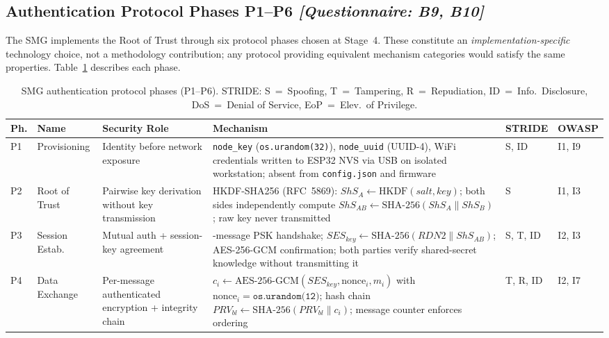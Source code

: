 \documentclass[12pt,a4paper]{article}
\newcommand{\qtag}[1]{\hfill\textcolor{gray!70}{\small\textit{[Questionnaire: #1]}}}
\begin{document}
\subsection{Authentication Protocol Phases P1--P6 \qtag{B9, B10}}
\label{sec:phases}

The SMG implements the Root of Trust through six protocol phases chosen at Stage~4. These constitute an \emph{implementation-specific} technology choice, not a methodology contribution; any protocol providing equivalent mechanism categories would satisfy the same properties. Table~\ref{tab:phases} describes each phase.

\begin{table}[htbp]
  \centering
  \caption{SMG authentication protocol phases (P1--P6). STRIDE: S~=~Spoofing, T~=~Tampering, R~=~Repudiation, ID~=~Info.\ Disclosure, DoS~=~Denial of Service, EoP~=~Elev.\ of Privilege.}
  \label{tab:phases}
  \small
  \renewcommand{\arraystretch}{1.2}
  \begin{tabular}{
      >{\centering\arraybackslash}p{0.5cm}
      >{\raggedright\arraybackslash}p{1.9cm}
      >{\raggedright\arraybackslash}p{2.0cm}
      >{\raggedright\arraybackslash}p{5.4cm}
      >{\centering\arraybackslash}p{1.9cm}
      >{\centering\arraybackslash}p{1.5cm}
  }
    \toprule
    \textbf{Ph.} & \textbf{Name} & \textbf{Security Role} & \textbf{Mechanism} & \textbf{STRIDE} & \textbf{OWASP} \\
    \midrule
    P1 & Provisioning & Identity before network exposure & \texttt{node\_key} (\texttt{os.urandom(32)}), \texttt{node\_uuid} (UUID-4), WiFi credentials written to ESP32 NVS via USB on isolated workstation; absent from \texttt{config.json} and firmware & S, ID & I1, I9 \\
    \midrule
    P2 & Root of Trust & Pairwise key derivation without key transmission & HKDF-SHA256 (RFC~5869): $ShS_A \leftarrow \text{HKDF}(salt, key)$; both sides independently compute $ShS_{AB} \leftarrow \text{SHA-256}(ShS_A \| ShS_B)$; raw key never transmitted & S & I1, I3 \\
    \midrule
    P3 & Session Estab. & Mutual auth + session-key agreement & 5-message PSK handshake; $SES_{key} \leftarrow \text{SHA-256}(RDN2 \| ShS_{AB})$; AES-256-GCM confirmation; both parties verify shared-secret knowledge without transmitting it & S, T, ID & I2, I3 \\
    \midrule
    P4 & Data Exchange & Per-message authenticated encryption + integrity chain & $c_i \leftarrow \text{AES-256-GCM}(SES_{key}, \text{nonce}_i, m_i)$ with $\text{nonce}_i = \texttt{os.urandom(12)}$; hash chain $PRV_{bl} \leftarrow \text{SHA-256}(PRV_{bl} \| c_i)$; message counter enforces ordering & T, R, ID & I2, I7 \\

\end{tabular}
\end{table}
\end{document}
